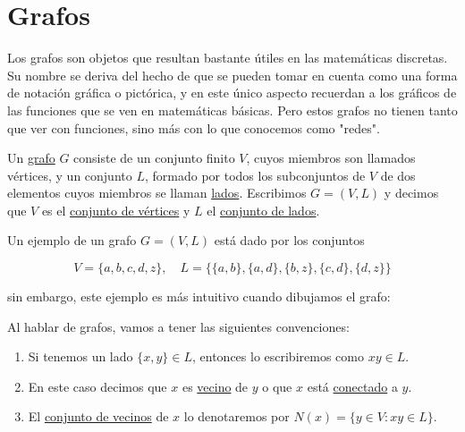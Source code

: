 
\section{Grafos}

Los grafos son objetos que resultan bastante útiles en las matemáticas discretas. Su nombre se deriva del hecho de que se pueden tomar en cuenta como una forma de notación gráfica o pictórica, y en este único aspecto recuerdan a los gráficos de las funciones que se ven en matemáticas básicas. Pero estos grafos no tienen tanto que ver con funciones, sino más con lo que conocemos como "redes".

\begin{defn}
    Un \ul{grafo} $G$ consiste de un conjunto finito $V$, cuyos miembros son llamados vértices, y un conjunto $L$, formado por todos los subconjuntos de $V$ de dos elementos cuyos miembros se llaman \ul{lados}. Escribimos $G = (V,L)$ y decimos que $V$ es el \ul{conjunto de vértices} y $L$ el \ul{conjunto de lados}.
\end{defn}

\begin{ejem}\label{ej:grafo}
    Un ejemplo de un grafo $G = (V,L)$ está dado por los conjuntos
    
    \[
    V = \{ a, b, c, d, z \}, \quad L = \{ \{a,b\}, \{a,d\}, \{b,z\}, \{c,d\}, \{d,z\} \}
    \]
    
    sin embargo, este ejemplo es más intuitivo cuando dibujamos el grafo:
    
    \begin{center}
    \end{center}
\end{ejem}

\begin{notn}
    Al hablar de grafos, vamos a tener las siguientes convenciones:
    \begin{enumerate}
        \item Si tenemos un lado $\{x,y\} \in L$, entonces lo escribiremos como $xy \in L$.
        \item En este caso decimos que $x$ es \ul{vecino} de $y$ o que $x$ está \ul{conectado} a $y$.
        \item El \ul{conjunto de vecinos} de $x$ lo denotaremos por $N(x) = \{ y \in V : xy \in L \}$.
    \end{enumerate}
\end{notn}

